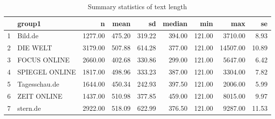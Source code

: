 \begin{table}[ht]
\centering
\begin{tabular}{rlrrrrrrr}
  \hline
 & group1 & n & mean & sd & median & min & max & se \\ 
  \hline
1 & Bild.de & 1277.00 & 475.20 & 319.22 & 394.00 & 121.00 & 3710.00 & 8.93 \\ 
  2 & DIE WELT & 3179.00 & 507.88 & 614.28 & 377.00 & 121.00 & 14507.00 & 10.89 \\ 
  3 & FOCUS ONLINE & 2660.00 & 402.68 & 330.86 & 299.00 & 121.00 & 5647.00 & 6.42 \\ 
  4 & SPIEGEL ONLINE & 1817.00 & 498.96 & 333.23 & 387.00 & 121.00 & 3304.00 & 7.82 \\ 
  5 & Tagesschau.de & 1644.00 & 450.34 & 242.93 & 397.50 & 121.00 & 2006.00 & 5.99 \\ 
  6 & ZEIT ONLINE & 1437.00 & 510.98 & 377.85 & 459.00 & 121.00 & 8015.00 & 9.97 \\ 
  7 & stern.de & 2922.00 & 518.09 & 622.99 & 376.50 & 121.00 & 9287.00 & 11.53 \\ 
   \hline
\end{tabular}
\caption{Summary statistics of text length} 
\end{table}

